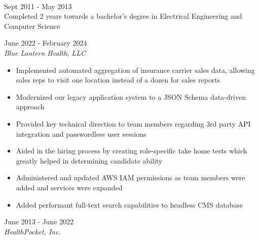 \documentclass{resume}
\begin{document}
\begin{spacing}{1.2}
\begin{paracol}{2}
\begin{flushright}
\begin{spacing}{1.1}
				\bigskip

				\small {}

				{\large{}}\\
				{\color{subcontent} Sept 2011 - May 2013}\\
				Completed 2 years towards a bachelor's degree in Electrical Engineering and Computer Science
			\end{spacing}
		\end{flushright}

		\switchcolumn
		\small {}
		
		{\large{}}
		\hfill{\color{subcontent} June 2022 - February 2024}\\
		\textit{Blue Lantern Health, LLC}
		
		\nointerlineskip
		\begin{itemize}
			\item Implemented automated aggregation of insurance carrier sales data, allowing sales reps to visit one location instead of a dozen for sales reports
			\item Modernized our legacy application system to a JSON Schema data-driven approach
			\item Provided key technical direction to team members regarding 3rd party API integration and passwordless user sessions
			\item Aided in the hiring process by creating role-specific take home tests which greatly helped in determining candidate ability
			\item Administered and updated AWS IAM permissions as team members were added and services were expanded
			\item Added performant full-text search capabilities to headless CMS database
		\end{itemize}

		\medskip

		{\large{}}
		\hfill{\color{subcontent} June 2013 - June 2022}\\
		\textit{HealthPocket, Inc.}


\end{paracol}
\end{spacing}
\end{document}
